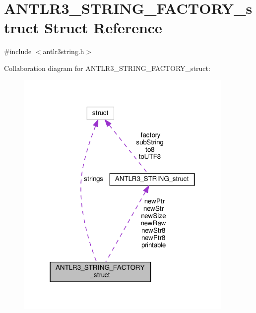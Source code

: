 \hypertarget{struct_a_n_t_l_r3___s_t_r_i_n_g___f_a_c_t_o_r_y__struct}{\section{A\-N\-T\-L\-R3\-\_\-\-S\-T\-R\-I\-N\-G\-\_\-\-F\-A\-C\-T\-O\-R\-Y\-\_\-struct Struct Reference}
\label{struct_a_n_t_l_r3___s_t_r_i_n_g___f_a_c_t_o_r_y__struct}
}


{\ttfamily \#include $<$antlr3string.\-h$>$}



Collaboration diagram for A\-N\-T\-L\-R3\-\_\-\-S\-T\-R\-I\-N\-G\-\_\-\-F\-A\-C\-T\-O\-R\-Y\-\_\-struct\-:
\nopagebreak
\begin{figure}[H]
\begin{center}
\leavevmode
\includegraphics[width=298pt]{struct_a_n_t_l_r3___s_t_r_i_n_g___f_a_c_t_o_r_y__struct__coll__graph}
\end{center}
\end{figure}
